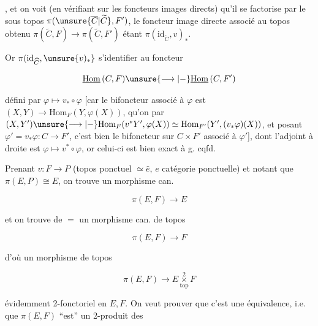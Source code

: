 
, et on voit (en vérifiant sur les foncteurs images directs) qu'il se factorise par le sous topos $\pi(\unsure{\overline C|\widetilde C},F')$, le foncteur image directe associé au   topos obtenu $\pi(\widetilde C,F)\longrightarrow\pi(\widetilde C,F')$ étant $\pi(\mathrm{id}_{\widetilde C},v)_*$.

Or $\pi(\mathrm{id}_{\widehat C},\unsure{v)_*}$  s'identifier au foncteur

\[
\underline{\mathrm{Hom}}\,(C,F)\unsure{\longrightarrow|-}\underline{\mathrm{Hom}}\,(C,F')
\]

défini par  $\varphi\longmapsto v_*\circ\varphi$ [car le bifoncteur associé à $\varphi$ est \deleted{\unsure{$\varphi$}} $(X,Y)\to\mathrm{Hom}_F(Y,\varphi(X))$, qu'on  par  $(X,Y')\unsure{\longrightarrow|-}\mathrm{Hom}_F(v^*Y',\varphi(X))\simeq\mathrm{Hom}_{F'}(Y',(v_*\varphi)(X))$, et posant $\varphi'=v_*\varphi\colon C\longrightarrow F'$, c'est bien le bifoncteur sur $C\times F'$ associé à $\varphi'$], dont l'adjoint à droite est $\varphi\longmapsto v^*\circ\varphi$, or celui-ci est bien exact à g. \qquad cqfd.

Prenant $v\colon F\longrightarrow P$ (topos ponctuel $\simeq\widehat e$, $e$ catégorie ponctuelle) et notant que $\pi(E,P)\cong E$, on trouve un morphisme can.

\[
\pi(E,F)\longrightarrow E
\]

et on trouve de $=$ un morphisme can. de topos

\[
\pi(E,F)\longrightarrow F
\]

d'où un morphisme de topos

\[
\pi(E,F)\longrightarrow E\mathbin{\underset{\mathrm{top}}{\overset{2}{\times}}}F
\]

évidemment 2-fonctoriel en $E,F$. On veut prouver que c'est une  équivalence, i.e. que $\pi(E,F)$ ``est'' un 2-produit des

